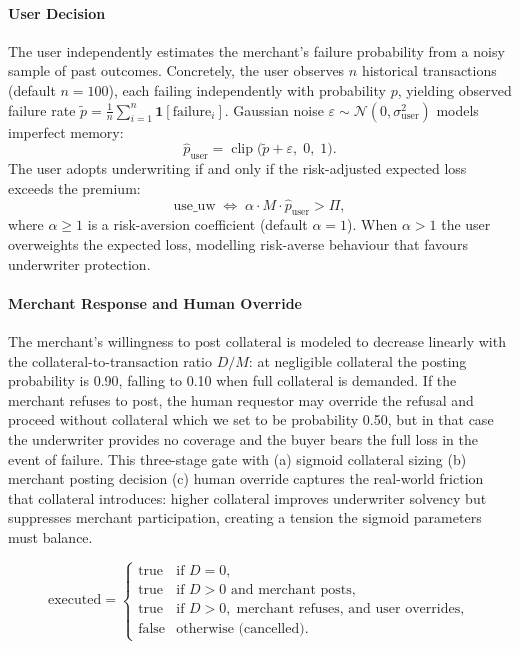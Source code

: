 \documentclass{article} %
\begin{document}
\paragraph{User Decision}
The user independently estimates the merchant's failure probability from
a noisy sample of past outcomes. Concretely, the user observes
$n$ historical transactions (default $n = 100$), each failing independently
with probability $p$, yielding observed failure rate
$\tilde{p} = \tfrac{1}{n}\sum_{i=1}^{n} \mathbf{1}[\text{failure}_i]$.
Gaussian noise $\varepsilon \sim \mathcal{N}(0, \sigma_\text{user}^2)$
models imperfect memory:
\begin{equation}\label{eq:user-estimate}
  \hat{p}_\text{user}
    = \operatorname{clip}\!\bigl(\tilde{p} + \varepsilon,\; 0,\; 1\bigr).
\end{equation}
The user adopts underwriting if and only if the risk-adjusted expected loss exceeds the premium:
\begin{equation}\label{eq:user-decision}
  \text{use\_uw}
    \;\Longleftrightarrow\;
    \alpha \cdot M \cdot \hat{p}_\text{user} > \Pi,
\end{equation}
where $\alpha \geq 1$ is a risk-aversion coefficient (default $\alpha = 1$).
When $\alpha > 1$ the user overweights the expected loss, modelling
risk-averse behaviour that favours underwriter protection.

\paragraph{Merchant Response and Human Override} The merchant's willingness to post collateral is modeled to decrease linearly with the collateral-to-transaction ratio $D/M$: at negligible collateral the posting probability is 0.90, falling to 0.10 when full collateral is demanded. If the merchant refuses to post, the human requestor may override the refusal and proceed without collateral which we set to be probability 0.50, but in that case the underwriter provides no coverage and the buyer bears the full loss in the event of failure. This three-stage gate with (a) sigmoid collateral sizing (b) merchant posting decision (c) human override captures the real-world friction that collateral introduces: higher collateral improves underwriter solvency but suppresses merchant participation, creating a tension the sigmoid parameters must balance.



\begin{equation}\label{eq:merchant-flow}
\text{executed} =
\begin{cases}
  \text{true}  & \text{if } D = 0, \\
  \text{true}  & \text{if } D > 0 \text{ and merchant posts}, \\
  \text{true}  & \text{if } D > 0,\; \text{merchant refuses, and user overrides}, \\
  \text{false} & \text{otherwise (cancelled)}.
\end{cases}
\end{equation}
\end{document}
